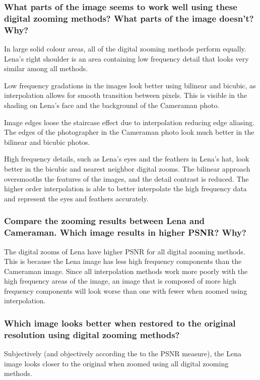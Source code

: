 \documentclass[article, 1.5space, letterpaper, 12pt, oneside, header, footer]{SydeClass}
\begin{document}
\subsubsection{What parts of the image seems to work well using these digital zooming methods? What parts of the
image doesn't? Why?}

In large solid colour areas, all of the digital zooming methods perform equally. Lena's right shoulder is an area containing low frequency detail that looks very similar among all methods.

Low frequency gradations in the images look better using bilinear and bicubic, as interpolation allows for smooth transition between pixels. This is visible in the shading on Lena's face and the background of the Cameraman photo.

Image edges loose the staircase effect due to interpolation reducing edge aliasing. The edges of the photographer in the Cameraman photo look much better in the bilinear and bicubic photos.


High frequency details, such as Lena's eyes and the feathers in Lena's hat, look better in the bicubic and nearest neighbor digital zooms. The bilinear approach oversmooths the features of the images, and the detail contrast is reduced. The higher order interpolation is able to better interpolate the high frequency data and represent the eyes and feathers accurately.


\subsubsection{Compare the zooming results between Lena and Cameraman. Which image results in higher PSNR? Why?}

The digital zooms of Lena have higher PSNR for all digital zooming methods. This is because the Lena image has less high frequency components than the Cameraman image. Since all interpolation methods work more poorly with the high frequency areas of the image, an image that is composed of more high frequency components will look worse than one with fewer when zoomed using interpolation.


\subsubsection{Which image looks better when restored to the original resolution using digital zooming methods?}

Subjectively (and objectively according the to the PSNR measure), the Lena image looks closer to the original when zoomed using all digital zooming methods.
\end{document}
